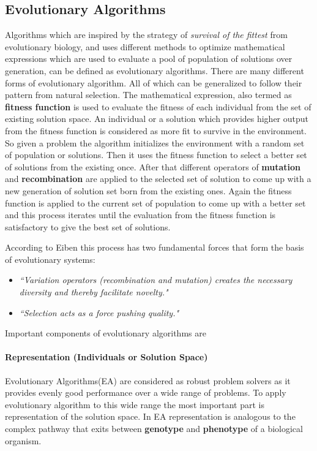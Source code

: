 \subsection{Evolutionary Algorithms}
Algorithms which are inspired by the strategy of \textit{survival of the fittest} from evolutionary biology, and uses different methods to optimize mathematical expressions which are used to evaluate a pool of population of solutions over generation, can be defined as evolutionary algorithms. There are many different forms of evolutionary algorithm. All of which can be generalized to follow their pattern from natural selection. The mathematical expression, also termed as \textbf{fitness function} is used to evaluate the fitness of each individual from the set of existing solution space. An individual or a solution which provides higher output from the fitness function is considered as more fit to survive in the environment. So given a problem the algorithm initializes the environment with a random set of population or solutions. Then it uses the fitness function to select a better set of solutions from the existing once. After that different operators of \textbf{mutation} and \textbf{recombination} are applied to the selected set of solution to come up with a new generation of solution set born from the existing ones. Again the fitness function is applied to the current set of population to come up with a better set and this process iterates until the evaluation from the fitness function is satisfactory to give the best set of solutions.

According to Eiben \cite{eiben2003} this process has two fundamental forces that form the basis of evolutionary systems:

\begin{itemize}
	\item \textsl{``Variation operators (recombination and mutation) creates the necessary diversity and thereby facilitate novelty."}
	\item \textsl{``Selection acts as a force pushing quality."}
\end{itemize}

Important components of evolutionary algorithms are

\paragraph{Representation (Individuals or Solution Space)}
Evolutionary Algorithms(EA) are considered as robust problem solvers as it provides evenly good performance over a wide range of problems. To apply evolutionary algorithm to this wide range the most important part is representation of the solution space. In EA representation is analogous to the complex pathway that exits between \textbf{genotype} and \textbf{phenotype} of a biological organism.

